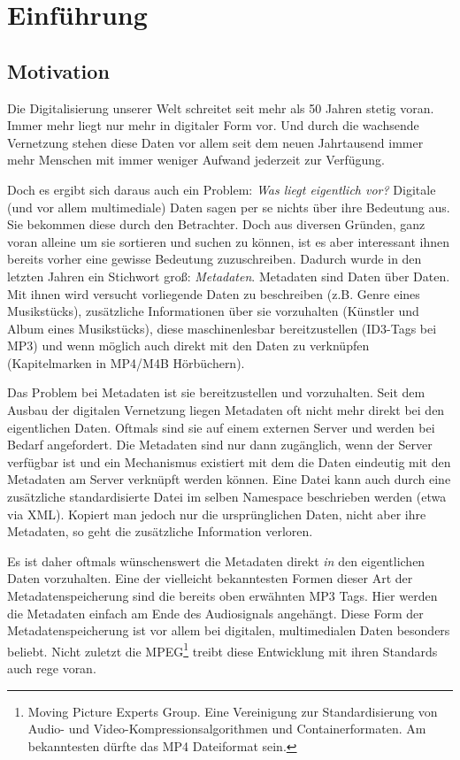 \chapter{Einf\"uhrung}
\label{ch:intro}

\section{Motivation}

Die Digitalisierung unserer Welt schreitet seit mehr als 50 Jahren stetig voran. Immer mehr liegt nur mehr in digitaler Form vor. Und durch die wachsende Vernetzung stehen diese Daten vor allem seit dem neuen Jahrtausend immer mehr Menschen mit immer weniger Aufwand jederzeit zur Verfügung. 

Doch es ergibt sich daraus auch ein Problem: \textit{Was liegt eigentlich vor?} Digitale (und vor allem multimediale) Daten sagen per se nichts über ihre Bedeutung aus. Sie bekommen diese durch den Betrachter. Doch aus diversen Gründen, ganz voran alleine um sie sortieren und suchen zu können, ist es aber interessant ihnen bereits vorher eine gewisse Bedeutung zuzuschreiben. Dadurch wurde in den letzten Jahren ein Stichwort groß: \textit{Metadaten}. Metadaten sind \glqq{}Daten über Daten\grqq{}. Mit ihnen wird versucht vorliegende Daten zu beschreiben (z.B. Genre eines Musikstücks), zusätzliche Informationen über sie vorzuhalten (Künstler und Album eines Musikstücks), diese maschinenlesbar bereitzustellen (ID3-Tags bei MP3) und wenn möglich auch direkt mit den Daten zu verknüpfen (Kapitelmarken in MP4/M4B Hörbüchern).

Das Problem bei Metadaten ist sie bereitzustellen und vorzuhalten. Seit dem Ausbau der digitalen Vernetzung liegen Metadaten oft nicht mehr direkt bei den eigentlichen Daten. Oftmals sind sie auf einem externen Server und werden bei Bedarf angefordert. Die Metadaten sind nur dann zugänglich, wenn der Server verfügbar ist und ein Mechanismus existiert mit dem die Daten eindeutig mit den Metadaten am Server verknüpft werden können. 
Eine Datei kann auch durch eine zusätzliche standardisierte Datei im selben Namespace beschrieben werden (etwa via XML). Kopiert man jedoch nur die ursprünglichen Daten, nicht aber ihre Metadaten, so geht die zusätzliche Information verloren. 

Es ist daher oftmals wünschenswert die Metadaten direkt \textit{in} den eigentlichen Daten vorzuhalten. Eine der vielleicht bekanntesten Formen dieser Art der Metadatenspeicherung sind die bereits oben erwähnten MP3 Tags. Hier werden die Metadaten einfach am Ende des Audiosignals angehängt. Diese Form der Metadatenspeicherung ist vor allem bei digitalen, multimedialen Daten besonders beliebt. Nicht zuletzt die MPEG\footnote{Moving Picture Experts Group. Eine Vereinigung zur Standardisierung von Audio- und Video-Kompressionsalgorithmen und Containerformaten. Am bekanntesten dürfte das MP4 Dateiformat sein.} treibt diese Entwicklung mit ihren Standards auch rege voran. 

